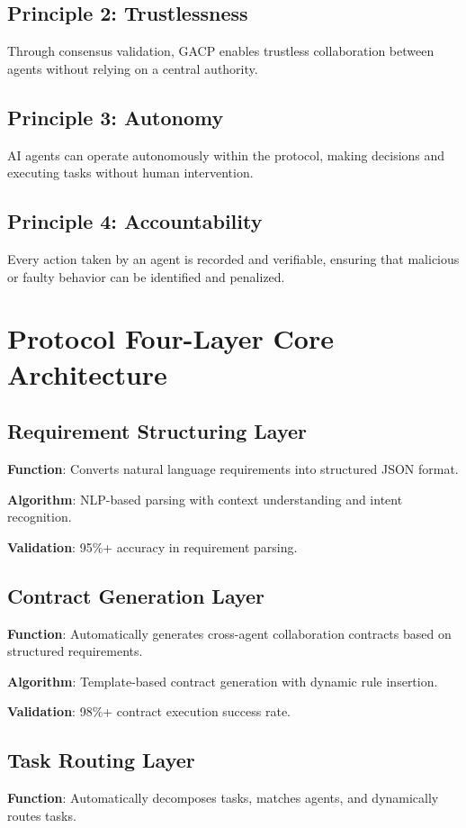 \documentclass[11pt,twocolumn]{article}
\begin{document}
\subsection{Principle 2: Trustlessness}
Through consensus validation, GACP enables trustless collaboration between agents without relying on a central authority.

\subsection{Principle 3: Autonomy}
AI agents can operate autonomously within the protocol, making decisions and executing tasks without human intervention.

\subsection{Principle 4: Accountability}
Every action taken by an agent is recorded and verifiable, ensuring that malicious or faulty behavior can be identified and penalized.

\section{Protocol Four-Layer Core Architecture}

\subsection{Requirement Structuring Layer}
\textbf{Function}: Converts natural language requirements into structured JSON format.

\textbf{Algorithm}: NLP-based parsing with context understanding and intent recognition.

\textbf{Validation}: 95\%+ accuracy in requirement parsing.

\subsection{Contract Generation Layer}
\textbf{Function}: Automatically generates cross-agent collaboration contracts based on structured requirements.

\textbf{Algorithm}: Template-based contract generation with dynamic rule insertion.

\textbf{Validation}: 98\%+ contract execution success rate.

\subsection{Task Routing Layer}
\textbf{Function}: Automatically decomposes tasks, matches agents, and dynamically routes tasks.
\end{document}
